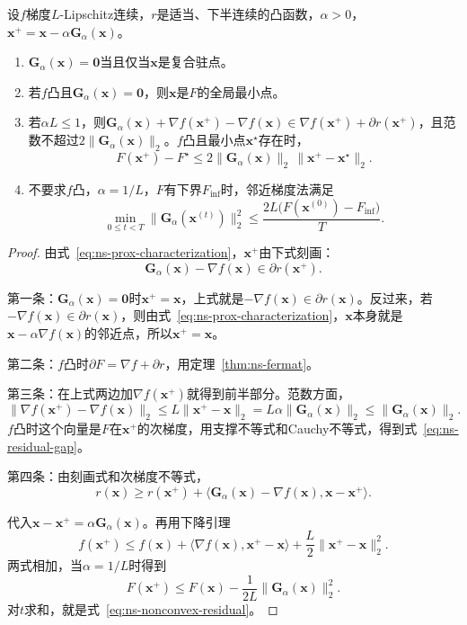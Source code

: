 \begin{theorem}[映射残差的含义]
\label{thm:ns-residual}
设$f$梯度$L$-Lipschitz连续，$r$是适当、下半连续的凸函数，$\alpha>0$，$\bm{x}^{+}=\bm{x}-\alpha\bm{G}_\alpha(\bm{x})$。
\begin{enumerate}
 \item $\bm{G}_\alpha(\bm{x})=\bm{0}$当且仅当$\bm{x}$是复合驻点。
 \item 若$f$凸且$\bm{G}_\alpha(\bm{x})=\bm{0}$，则$\bm{x}$是$F$的全局最小点。
 \item 若$\alpha L\leq1$，则$\bm{G}_\alpha(\bm{x})+\nabla f(\bm{x}^{+})-\nabla f(\bm{x})\in\nabla f(\bm{x}^{+})+\partial r(\bm{x}^{+})$，且范数不超过$2\lVert\bm{G}_\alpha(\bm{x})\rVert_2$。$f$凸且最小点$\bm{x}^\star$存在时，
 \begin{equation}
  F(\bm{x}^{+})-F^\star\leq2\lVert\bm{G}_\alpha(\bm{x})\rVert_2\,\lVert\bm{x}^{+}-\bm{x}^\star\rVert_2.
  \label{eq:ns-residual-gap}
 \end{equation}
 \item 不要求$f$凸，$\alpha=1/L$，$F$有下界$F_{\inf}$时，邻近梯度法满足
 \begin{equation}
  \min_{0\leq t<T}\lVert\bm{G}_\alpha(\bm{x}^{(t)})\rVert_2^2\leq\frac{2L\bigl(F(\bm{x}^{(0)})-F_{\inf}\bigr)}{T}.
  \label{eq:ns-nonconvex-residual}
 \end{equation}
\end{enumerate}
\end{theorem}

\begin{proof}
由式~\eqref{eq:ns-prox-characterization}，$\bm{x}^{+}$由下式刻画：
\[
 \bm{G}_\alpha(\bm{x})-\nabla f(\bm{x})\in\partial r(\bm{x}^{+}).
\]

第一条：$\bm{G}_\alpha(\bm{x})=\bm{0}$时$\bm{x}^{+}=\bm{x}$，上式就是$-\nabla f(\bm{x})\in\partial r(\bm{x})$。反过来，若$-\nabla f(\bm{x})\in\partial r(\bm{x})$，则由式~\eqref{eq:ns-prox-characterization}，$\bm{x}$本身就是$\bm{x}-\alpha\nabla f(\bm{x})$的邻近点，所以$\bm{x}^{+}=\bm{x}$。

第二条：$f$凸时$\partial F=\nabla f+\partial r$，用定理~\ref{thm:ns-fermat}。

第三条：在上式两边加$\nabla f(\bm{x}^{+})$就得到前半部分。范数方面，
\[
 \lVert\nabla f(\bm{x}^{+})-\nabla f(\bm{x})\rVert_2\leq L\lVert\bm{x}^{+}-\bm{x}\rVert_2=L\alpha\lVert\bm{G}_\alpha(\bm{x})\rVert_2\leq\lVert\bm{G}_\alpha(\bm{x})\rVert_2.
\]
$f$凸时这个向量是$F$在$\bm{x}^{+}$的次梯度，用支撑不等式和Cauchy不等式，得到式~\eqref{eq:ns-residual-gap}。

第四条：由刻画式和次梯度不等式，
\[
 r(\bm{x})\geq r(\bm{x}^{+})+\langle\bm{G}_\alpha(\bm{x})-\nabla f(\bm{x}),\bm{x}-\bm{x}^{+}\rangle.
\]

代入$\bm{x}-\bm{x}^{+}=\alpha\bm{G}_\alpha(\bm{x})$。再用下降引理
\[
 f(\bm{x}^{+})\leq f(\bm{x})+\langle\nabla f(\bm{x}),\bm{x}^{+}-\bm{x}\rangle+\frac L2\lVert\bm{x}^{+}-\bm{x}\rVert_2^2.
\]
两式相加，当$\alpha=1/L$时得到
\[
 F(\bm{x}^{+})\leq F(\bm{x})-\frac{1}{2L}\lVert\bm{G}_\alpha(\bm{x})\rVert_2^2.
\]
对$t$求和，就是式~\eqref{eq:ns-nonconvex-residual}。
\end{proof}

